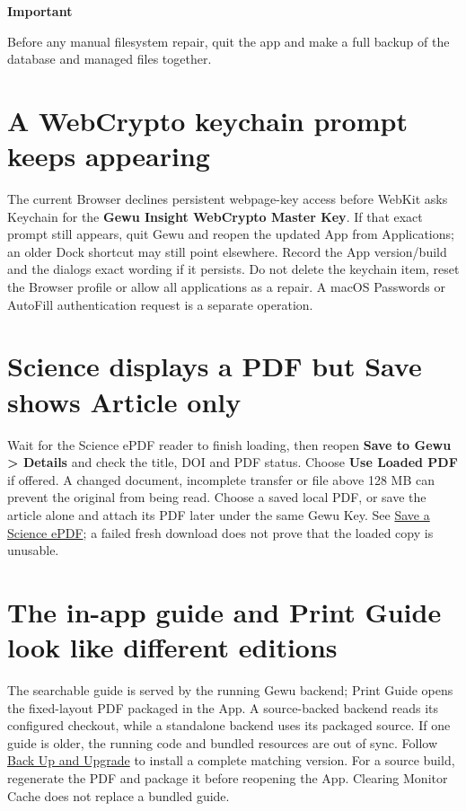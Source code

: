 \documentclass[10pt,letterpaper,oneside]{scrreprt}
\renewenvironment{quote}
  {\Needspace{5\baselineskip}\begin{tcolorbox}[enhanced,breakable,colback=GewuPale,colframe=GewuPale,boxrule=0pt,
    borderline west={1.6pt}{0pt}{GewuBlue},arc=1.2mm,left=2.5mm,right=2.5mm,top=1.7mm,bottom=1.7mm,
    before skip=4pt,after skip=5pt,fontupper=\color{GewuInk}\small]}
  {\end{tcolorbox}}
\begin{document}
\begin{quote}
\textbf{Important}

Before any manual filesystem repair, quit the app and make a full backup of the database and managed files together.
\end{quote}

\section{A WebCrypto keychain prompt keeps appearing}\label{browser-key-prompt}

The current Browser declines persistent webpage-key access before WebKit asks Keychain for the \textbf{Gewu Insight WebCrypto Master Key}. If that exact prompt still appears, quit Gewu and reopen the updated App from Applications; an older Dock shortcut may still point elsewhere. Record the App version/build and the dialog\textquotesingle s exact wording if it persists. Do not delete the keychain item, reset the Browser profile or allow all applications as a repair. A macOS Passwords or AutoFill authentication request is a separate operation.

\section{Science displays a PDF but Save shows Article only}\label{science-loaded-pdf-help}

Wait for the Science ePDF reader to finish loading, then reopen \textbf{Save to Gewu \textgreater{} Details} and check the title, DOI and PDF status. Choose \textbf{Use Loaded PDF} if offered. A changed document, incomplete transfer or file above 128 MB can prevent the original from being read. Choose a saved local PDF, or save the article alone and attach its PDF later under the same Gewu Key. See \hyperref[browser-science-epdf]{Save a Science ePDF}; a failed fresh download does not prove that the loaded copy is unusable.

\section{The in-app guide and Print Guide look like different editions}\label{the-in-app-guide-and-print-guide-look-like-different-editions}

The searchable guide is served by the running Gewu backend; Print Guide opens the fixed-layout PDF packaged in the App. A source-backed backend reads its configured checkout, while a standalone backend uses its packaged source. If one guide is older, the running code and bundled resources are out of sync. Follow \hyperref[upgrade-installation]{Back Up and Upgrade} to install a complete matching version. For a source build, regenerate the PDF and package it before reopening the App. Clearing Monitor Cache does not replace a bundled guide.
\end{document}
